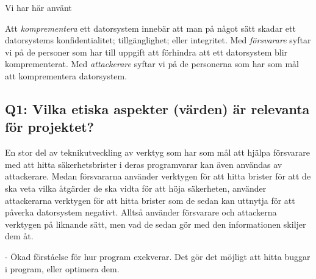 

Vi har här använt 

Att \emph{komprementera} ett datorsystem innebär att man på något sätt skadar ett datorsystems konfidentialitet; tillgänglighet; eller integritet.
Med \emph{försvarare} syftar vi på de personer som har till uppgift att förhindra att ett datorsystem blir komprementerat.
Med \emph{attackerare} syftar vi på de personerna som har som mål att komprementera datorsystem.

\subsection{Q1: Vilka etiska aspekter (värden) är relevanta för projektet?}


En stor del av teknikutveckling av verktyg som har som mål att hjälpa försvarare med att hitta säkerhetsbrister i deras programvarar kan även användas av attackerare.
Medan försvararna använder verktygen för att hitta brister för att de ska veta vilka åtgärder de ska vidta för att höja säkerheten, använder attackerarna verktygen för att hitta brister som de sedan kan uttnytja för att påverka datorsystem negativt.
Alltså använder försvarare och attackerna verktygen på liknande sätt, men vad de sedan gör med den informationen skiljer dem åt.

- Ökad förståelse för hur program exekverar. Det gör det möjligt att hitta buggar i program, eller optimera dem.

